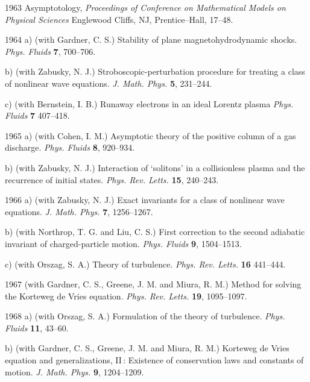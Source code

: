 \documentclass[11pt]{article}
\begin{document}
\item[1963] Asymptotology, %
\textit{Proceedings of Conference on Mathematical Models on Physical Sciences} Englewood Cliffs, NJ, Prentice--Hall, 17--48.

\item[1964] a)	(with Gardner, C. S.) Stability of plane magnetohydrodynamic shocks. \textit{Phys. Fluids} \textbf{7}, 700--706.

											b) (with Zabusky, N. J.) Stroboscopic-perturbation procedure for treating a class of nonlinear wave equations. 
														\textit{J. Math. Phys.} \textbf{5}, 231--244. 	

											c) (with Bernstein, I. B.) Runaway electrons in an ideal Lorentz plasma \textit{Phys. Fluids} \textbf{7} 407--418. 	

\item[1965] a)	(with Cohen, I. M.) Asymptotic theory of the positive column of a gas discharge. \textit{Phys. Fluids} 
\textbf{8}, 920--934. 

											b) (with Zabusky, N. J.) Interaction of `solitons' in a collisionless plasma and the recurrence of initial states. \textit{Phys. Rev. Letts.} \textbf{15}, 240--243. 

\item[1966]	a) (with Zabusky, N. J.) Exact invariants for a class of nonlinear wave equations. \textit{J. Math. Phys.} 
\textbf{7}, 1256--1267. 	

											b)	(with Northrop, T. G. and Liu, C. S.) First correction to the second adiabatic invariant of charged-particle motion. \textit{ Phys. Fluids} \textbf{9}, 1504--1513. 

											c)	(with Orszag, S. A.) Theory of turbulence. \textit{Phys. Rev. Letts.} \textbf{16} 441--444.

\item[1967] (with Gardner, C. S., Greene, J. M. and Miura, R. M.) Method for solving the Korteweg de Vries equation. 
\textit{Phys. Rev. Letts.} \textbf{19}, 1095--1097. 

\item[1968] a) (with Orszag, S. A.) Formulation of the theory of turbulence. \textit{Phys. Fluids} \textbf{11}, 43--60. 	

											b) (with Gardner, C. S., Greene, J. M. and Miura, R. M.)  Korteweg de Vries equation and generalizations, II\,: 
											Existence of conservation laws and constants of motion. \textit{J. Math. Phys.} \textbf{9}, 1204--1209. 
\end{document}
